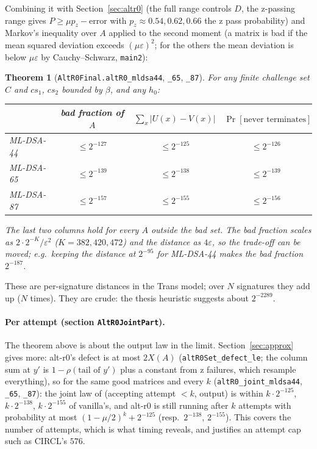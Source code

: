\documentclass[11pt]{article}
\newtheorem{theorem}{Theorem}
\theoremstyle{definition}
\theoremstyle{remark}
\newcommand{\lean}[1]{\texttt{#1}}
\renewcommand{\Pr}{\mathop{\mathrm{Pr}}}
\begin{document}
Combining it with Section~\ref{sec:altr0} (the full range controls $D$, the z-passing range gives
$P \ge \mu p_z - \text{error}$ with $p_z \approx 0.54, 0.62, 0.66$ the z pass probability) and
Markov's inequality over $A$ applied to the second moment (a matrix is bad if the mean squared
deviation exceeds $(\mu\varepsilon)^2$; for the others the mean deviation is below
$\mu\varepsilon$ by Cauchy--Schwarz, \lean{main2}):

\begin{theorem}[\lean{AltR0Final.altR0\_mldsa44}, \lean{\_65}, \lean{\_87}]
For any finite challenge set $C$ and $c s_1$, $c s_2$ bounded by $\beta$, and any $h_0$:
\begin{center}
\begin{tabular}{@{}lccc@{}}
\toprule
 & bad fraction of $A$ & $\sum_x|U(x)-V(x)|$ & $\Pr[\text{never terminates}]$\\
\midrule
ML-DSA-44 & $\le 2^{-127}$ & $\le 2^{-125}$ & $\le 2^{-126}$\\
ML-DSA-65 & $\le 2^{-139}$ & $\le 2^{-138}$ & $\le 2^{-139}$\\
ML-DSA-87 & $\le 2^{-157}$ & $\le 2^{-155}$ & $\le 2^{-156}$\\
\bottomrule
\end{tabular}
\end{center}
The last two columns hold for every $A$ outside the bad set. The bad fraction scales as
$2\cdot 2^{-K}/\varepsilon^2$ ($K = 382, 420, 472$) and the distance as $4\varepsilon$, so the
trade-off can be moved; e.g.\ keeping the distance at $2^{-95}$ for ML-DSA-44 makes the bad
fraction $2^{-187}$.
\end{theorem}

These are per-signature distances in the Trans model; over $N$ signatures they add up ($N$ times).
They are crude: the thesis heuristic suggests about $2^{-2289}$.

\paragraph{Per attempt (section \lean{AltR0JointPart}).} The theorem above is about the output law
in the limit. Section~\ref{sec:approx} gives more: alt-r0's defect is at most $2X(A)$
(\lean{altR0Set\_defect\_le}; the column sum at $y'$ is $1-\rho(\text{tail of }y')$ plus a constant
from z failures, which resample everything), so for the same good matrices and every $k$
(\lean{altR0\_joint\_mldsa44}, \lean{\_65}, \lean{\_87}):
the joint law of (accepting attempt $<k$, output) is within $k\cdot 2^{-125}$, $k\cdot 2^{-138}$,
$k\cdot 2^{-155}$ of vanilla's, and alt-r0 is still running after $k$ attempts with probability
at most $(1-\mu/2)^k + 2^{-125}$ (resp.\ $2^{-138}$, $2^{-155}$). This covers the number of
attempts, which is what timing reveals, and justifies an attempt cap such as CIRCL's $576$.
\end{document}
